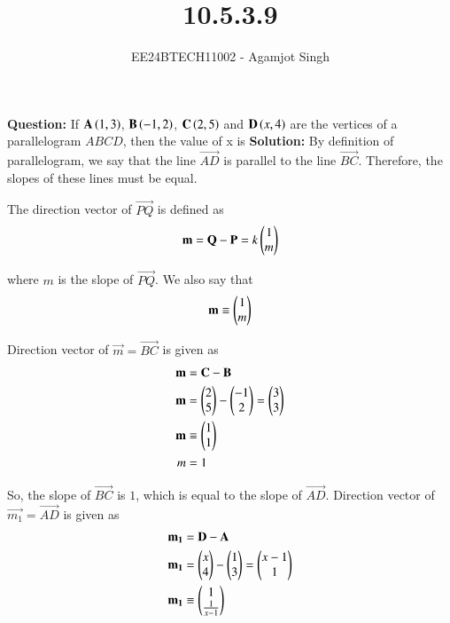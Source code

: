 \documentclass[journal]{IEEEtran}
\begin{document}

\vspace{3cm}

\title{10.5.3.9}
\author{EE24BTECH11002 - Agamjot Singh
}
{\let\newpage\relax\maketitle}

\renewcommand{\thefigure}{\theenumi}
\renewcommand{\thetable}{\theenumi}
\setlength{\intextsep}{10pt} %

\textbf{Question:}
\newline
If $\mathbf{A}\left(1,3\right)$, $\mathbf{B}\left(-1,2\right)$, $\mathbf{C}\left(2,5\right)$ and $\mathbf{D}\left(x,4\right)$ are the vertices of a parallelogram $ABCD$, then the value of x is
\newline
\textbf{Solution:}
By definition of parallelogram, we say that the line $\vec{AD}$ is parallel to the line $\vec{BC}$. 
Therefore, the slopes of these lines must be equal.
\newline

The direction vector of $\vec{PQ}$ is defined as
\begin{align*}
	\mathbf{m} = \mathbf{Q} - \mathbf{P} = k\begin{pmatrix}1\\m\end{pmatrix}
\end{align*}

where $m$ is the slope of $\vec{PQ}$. We also say that
\begin{align*}
	\mathbf{m}\equiv\begin{pmatrix}1\\m\end{pmatrix}
\end{align*}

Direction vector of $\vec{m} = \vec{BC}$ is given as
\begin{align}
	\mathbf{m}  &= \mathbf{C} - \mathbf{B}\\
	\mathbf{m}  &= \begin{pmatrix}2\\5\end{pmatrix}  - \begin{pmatrix}-1\\2\end{pmatrix}
		 = \begin{pmatrix}3\\3\end{pmatrix}\\
	\mathbf{m}  &\equiv \begin{pmatrix}1\\1\end{pmatrix}\\
	       m &= 1	
\end{align}

So, the slope of $\vec{BC}$ is $1$, which is equal to the slope of $\vec{AD}$.
\newline
Direction vector of $\vec{m_1} = \vec{AD}$ is given as
\begin{align}
	\mathbf{m_1} &= \mathbf{D} - \mathbf{A}\\
	\mathbf{m_1} &= \begin{pmatrix}x\\4\end{pmatrix} - \begin{pmatrix}1\\3\end{pmatrix}
		   = \begin{pmatrix}x-1\\1\end{pmatrix}\\
	\mathbf{m_1} &\equiv \begin{pmatrix}1\\\frac{1}{x-1}\end{pmatrix}
\end{align}
\end{document}
